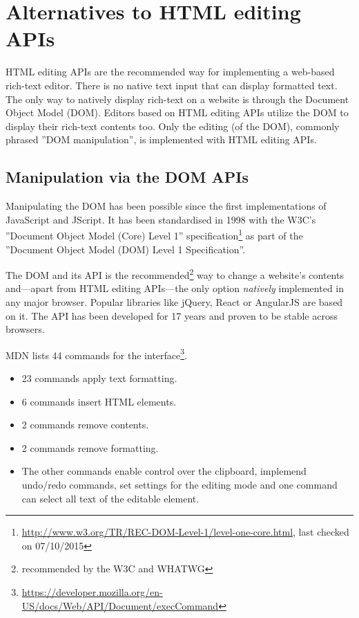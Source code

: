 \section{Alternatives to HTML editing APIs}

HTML editing APIs are the recommended way for implementing a web-based rich-text editor. There is no native text input that can display formatted text. The only way to natively display rich-text on a website is through the Document Object Model (DOM). Editors based on HTML editing APIs utilize the DOM to display their rich-text contents too. Only the editing (of the DOM), commonly phrased ''DOM manipulation'', is implemented with HTML editing APIs.

\subsection{Manipulation via the DOM APIs} Manipulating the DOM has been possible since the first implementations of JavaScript and JScript. It has been standardised in 1998 with the W3C's ''Document Object Model (Core) Level 1'' specification\footnote{\url{http://www.w3.org/TR/REC-DOM-Level-1/level-one-core.html}, last checked on 07/10/2015} as part of the ''Document Object Model (DOM) Level 1 Specification''.

The DOM and its API is the recommended\footnote{recommended by the W3C and WHATWG} way to change a website's contents and---apart from HTML editing APIs---the only option \textit{natively} implemented in any major browser. Popular libraries like jQuery, React or AngularJS are based on it. The API has been developed for 17 years and proven to be stable across browsers. 

MDN lists 44 commands for the  interface\footnote{\url{https://developer.mozilla.org/en-US/docs/Web/API/Document/execCommand}}. 

\begin{itemize}
\item 23 commands apply text formatting.
\item 6 commands insert HTML elements.
\item 2 commands remove contents.
\item 2 commands remove formatting.
\item The other commands enable control over the clipboard, implemend undo/redo commands, set settings for the editing mode and one command can select all text of the editable element.
\end{itemize}

